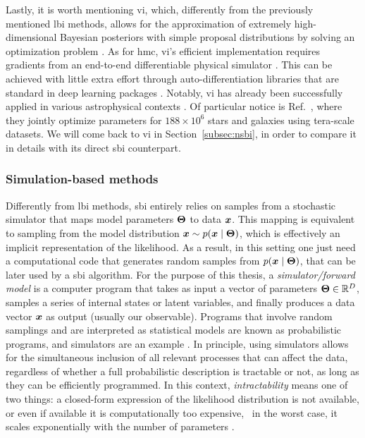 Lastly, it is worth mentioning \gls*{vi}, which, differently from the previously mentioned \gls*{lbi} methods, allows for the approximation of extremely high-dimensional Bayesian posteriors with simple proposal distributions by solving an optimization problem \cite{hoffman2013stochastic, zhang2018advances}. As for \gls*{hmc}, \gls*{vi}'s efficient implementation requires gradients from an end-to-end differentiable physical simulator \cite[\eg][]{caustic, Morvan_2021, sstrax}. This can be achieved with little extra effort through auto-differentiation libraries that are standard in deep learning packages \cite[\eg][]{pytorch, jax2018github}. Notably, \gls*{vi} has already been successfully applied in various astrophysical contexts \cite{regier2019cataloging, liu2023variational, Mishra-Sharma:2020kjb, Karchev:2021fro, leike2020resolving}. Of particular notice is Ref.~\cite{regier2019cataloging}, where they jointly optimize parameters for $188\times 10^6$ stars and galaxies using tera-scale datasets. We will come back to \gls*{vi} in Section~\ref{subsec:nsbi}, in order to compare it in details with its direct \gls*{sbi} counterpart. 

\subsubsection{Simulation-based methods}

Differently from \gls*{lbi} methods, \gls*{sbi} entirely relies on samples from a stochastic simulator that maps model parameters $\bm{\Theta}$ to data $\bm{x}$. This mapping is equivalent to sampling from the model distribution $\bm{x} \sim p(\bm{x}\mid\bm{\Theta})$, which is effectively an implicit representation of the likelihood. As a result, in this setting one just need a computational code that generates random samples from $p(\bm{x}\mid\bm{\Theta})$, that can be later used by a \gls*{sbi} algorithm. For the purpose of this thesis, a \emph{simulator/forward model} is a computer program that takes as input a vector of parameters $\bm{\Theta} \in \mathbb{R}^D$, samples a series of internal states or latent variables, and finally produces a data vector  $\bm{x}$  as output (usually our observable). Programs that involve random samplings and are interpreted as statistical models are known as probabilistic programs, and simulators are an example \cite{Cranmer:2019eaq}. In principle, using simulators allows for the simultaneous inclusion of all relevant processes that can affect the data, regardless of whether a full probabilistic description is tractable or not, as long as they can be efficiently programmed. In this context, \emph{intractability} means one of two things: a closed-form expression of the likelihood distribution is not available, or even if available it is computationally too expensive, \eg\, in the worst case, it scales exponentially with the number of parameters \cite{Leclercq:2018who, Mootoovaloo:2020ott}.

